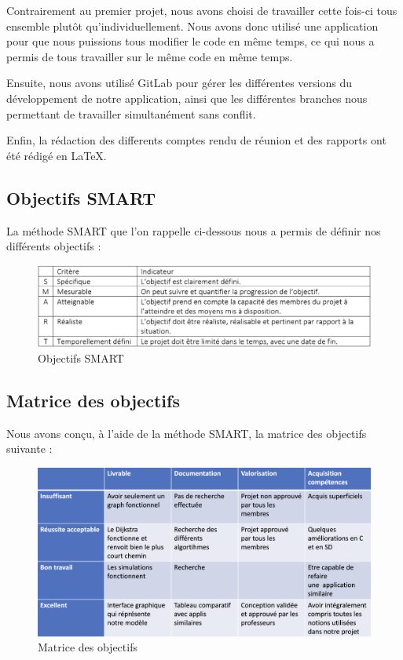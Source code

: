 \documentclass[french,a4paper]{article}
\begin{document}
Contrairement au premier projet, nous avons choisi de travailler cette fois-ci tous ensemble plutôt qu'individuellement. Nous avons donc utilisé une 
application pour que nous puissions tous modifier le code en même temps, ce qui nous a permis de tous travailler sur le même code en même temps.

Ensuite, nous avons utilisé GitLab pour gérer les différentes versions du développement de notre application, ainsi que les différentes 
branches nous permettant de travailler simultanément sans conflit.

Enfin, la rédaction des differents comptes rendu de réunion et des rapports ont été rédigé en \LaTeX.

\subsection{Objectifs SMART}
La méthode SMART que l'on rappelle ci-dessous nous a permis de définir nos différents objectifs :

\begin{figure}[H]
    \centering
    \includegraphics[width=1\textwidth]{img/SMART.png}
    \caption{Objectifs SMART}
\end{figure}

\subsection{Matrice des objectifs}
Nous avons conçu, à l'aide de la méthode SMART, la matrice des objectifs suivante :

\begin{figure}[H]
    \centering
    \includegraphics[width=1\textwidth]{img/matrice_des_objectifs.png}
    \caption{Matrice des objectifs}
\end{figure}
\end{document}
